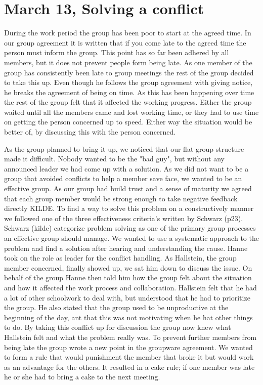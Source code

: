 \section{March 13, Solving a conflict}


During the work period the group has been poor to start at the agreed time. In our group agreement it is written that if you come late to the agreed time the person must inform the group. This point has so far been adhered by all members, but it does not prevent people form being late. As one member of the group has consistently been late to group meetings the rest of the group decided to take this up. Even though he follows the group agreement with giving notice, he breaks the agreement of being on time. As this has been happening over time the rest of the group felt that it affected the working progress. Either the group waited until all the members came and lost working time, or they had to use time on getting the person concerned up to speed. Either way the situation would be better of, by discussing this with the person concerned.

As the group planned to bring it up, we noticed that our flat group structure made it difficult. Nobody wanted to be the "bad guy", but without any announced leader we had come up with a solution. As we did not want to be a group that avoided conflicts to help a member save face, we wanted to be an effective group. As our group had build trust and a sense of maturity we agreed that each group member would be strong enough to take negative feedback directly KILDE. To find a way to solve this problem on a constructively manner we followed one of the three effectiveness criteria’s written by Schwarz (p23). Schwarz (kilde) categorize problem solving as one of the primary group processes an effective group should manage. We wanted to use a systematic approach to the problem and find a solution after hearing and understanding the cause. Hanne took on the role as leader for the conflict handling. As Hallstein, the group member concerned, finally showed up, we sat him down to discuss the issue. On behalf of the group Hanne then told him how the group felt about the situation and how it affected the work process and collaboration. Hallstein felt that he had a lot of other schoolwork to deal with, but understood that he had to prioritize the group. He also stated that the group used to be unproductive at the beginning of the day, ant that this was not motivating when he hat other things to do. By taking this conflict up for discussion the group now knew what Hallstein felt and what the problem really was. To prevent further members from being late the group wrote a new point in the groupware agreement. We wanted to form a rule that would punishment the member that broke it but would work as an advantage for the others. It resulted in a cake rule; if one member was late he or she had to bring a cake to the next meeting. 

